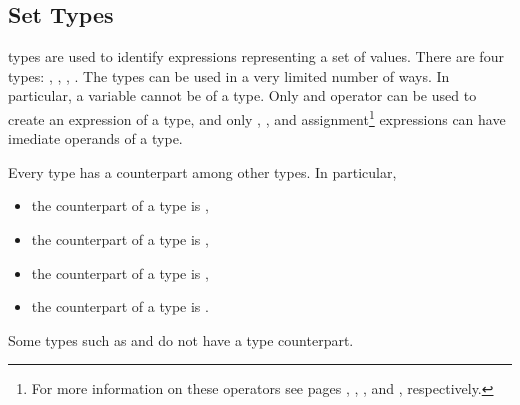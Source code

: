 %
%
%

\subsection{Set Types}
\label{Set Types}

\Set types are used to identify expressions representing a set of values.
There are four \Set types: \BoolSet, \IntSet, \SymbSet, \IntSymbSet.
The \Set types can be used in a very limited number of ways. In
particular, a variable cannot be of a \Set type. Only  and  operator can be used to create an
expression of a \Set type, and only
, , \itebullet and assignment\footnote{For more information
on these operators see pages \pageref{Range Constant},
\pageref{Set Expressions},
\pageref{Inclusion Operator}, \pageref{Case Expressions} and
\pageref{ASSIGN Constraint}, respectively.} expressions can have imediate operands of a \Set
type.

Every \Set type has a counterpart among other types. In particular,
\begin{itemize}
\item[] the counterpart of a \BoolSet type is \Boolean,
\item[] the counterpart of a \IntSet type is \Integer,
\item[] the counterpart of a \SymbSet type is \SymbEnum,
\item[] the counterpart of a \IntSymbSet type is \IntSymbEnum.
\end{itemize}
Some types such as \UWord and \SWord %
do not have a \Set type counterpart.


